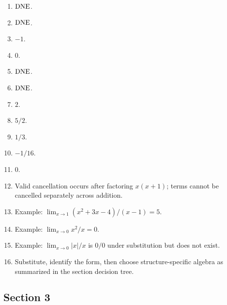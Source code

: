 \begin{enumerate}[label=\textbf{2.\arabic*}]
  \item \(\mathrm{DNE}\).
  \item \(\mathrm{DNE}\).
  \item \(-1\).
  \item \(0\).
  \item \(\mathrm{DNE}\).
  \item \(\mathrm{DNE}\).
  \item \(2\).
  \item \(5/2\).
  \item \(1/3\).
  \item \(-1/16\).
  \item \(0\).
  \item Valid cancellation occurs after factoring \(x(x+1)\); terms cannot be cancelled separately across addition.
  \item Example: \(\lim_{x\to1}(x^2+3x-4)/(x-1)=5\).
  \item Example: \(\lim_{x\to0}x^2/x=0\).
  \item Example: \(\lim_{x\to0}|x|/x\) is \(0/0\) under substitution but does not exist.
  \item Substitute, identify the form, then choose structure-specific algebra as summarized in the section decision tree.
\end{enumerate}

\subsection*{Section 3}

